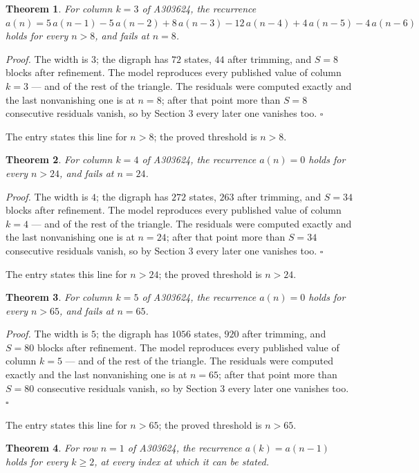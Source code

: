 \documentclass[11pt]{article}
\newtheorem{theorem}{Theorem}
\theoremstyle{definition}
\begin{document}
\begin{theorem} For column $k = 3$ of A303624, the recurrence $a(n) = 5\,a(n-1) - 5\,a(n-2) + 8\,a(n-3) - 12\,a(n-4) + 4\,a(n-5) - 4\,a(n-6)$ holds for every $n > 8$, and fails at $n = 8$.\end{theorem}

{\itshape Proof.} The width is $3$; the digraph has $72$ states, $44$ after trimming, and $S = 8$ blocks after refinement. The model reproduces every published value of column $k = 3$ --- and of the rest of the triangle. The residuals were computed exactly and the last nonvanishing one is at $n = 8$; after that point more than $S = 8$ consecutive residuals vanish, so by Section 3 every later one vanishes too. $\square$

The entry states this line for $n > 8$; the proved threshold is $n > 8$.

\begin{theorem} For column $k = 4$ of A303624, the recurrence $a(n) = 0$ holds for every $n > 24$, and fails at $n = 24$.\end{theorem}

{\itshape Proof.} The width is $4$; the digraph has $272$ states, $263$ after trimming, and $S = 34$ blocks after refinement. The model reproduces every published value of column $k = 4$ --- and of the rest of the triangle. The residuals were computed exactly and the last nonvanishing one is at $n = 24$; after that point more than $S = 34$ consecutive residuals vanish, so by Section 3 every later one vanishes too. $\square$

The entry states this line for $n > 24$; the proved threshold is $n > 24$.

\begin{theorem} For column $k = 5$ of A303624, the recurrence $a(n) = 0$ holds for every $n > 65$, and fails at $n = 65$.\end{theorem}

{\itshape Proof.} The width is $5$; the digraph has $1056$ states, $920$ after trimming, and $S = 80$ blocks after refinement. The model reproduces every published value of column $k = 5$ --- and of the rest of the triangle. The residuals were computed exactly and the last nonvanishing one is at $n = 65$; after that point more than $S = 80$ consecutive residuals vanish, so by Section 3 every later one vanishes too. $\square$

The entry states this line for $n > 65$; the proved threshold is $n > 65$.

\begin{theorem} For row $n = 1$ of A303624, the recurrence $a(k) = a(n-1)$ holds for every $k \ge 2$, at every index at which it can be stated.\end{theorem}
\end{document}
